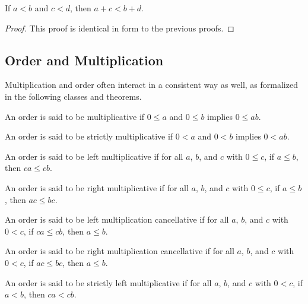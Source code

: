 \documentclass[../../math.tex]{subfiles}
\begin{document}
\begin{theorem} \label{lt_lrplus}
    If $a < b$ and $c < d$, then $a + c < b + d$.
\end{theorem}
\begin{proof}
    This proof is identical in form to the previous proofs.
\end{proof}

\subsection{Order and Multiplication}

Multiplication and order often interact in a consistent way as well, as
formalized in the following classes and theorems.

\begin{class}
    An order is said to be multiplicative if $0 \leq a$ and $0 \leq b$ implies
    $0 \leq ab$.
\end{class}

\begin{class}
    An order is said to be strictly multiplicative if $0 < a$ and $0 < b$
    implies $0 < ab$.
\end{class}

\begin{class}
    An order is said to be left multiplicative if for all $a$, $b$, and $c$ with
    $0 \leq c$, if $a \leq b$, then $ca \leq cb$.
\end{class}

\begin{class}
    An order is said to be right multiplicative if for all $a$, $b$, and $c$
    with $0 \leq c$, if $a \leq b$, then $ac \leq bc$.
\end{class}

\begin{class}
    An order is said to be left multiplication cancellative if for all $a$, $b$,
    and $c$ with $0 < c$, if $ca \leq cb$, then $a \leq b$.
\end{class}

\begin{class}
    An order is said to be right multiplication cancellative if for all $a$,
    $b$, and $c$ with $0 < c$, if $ac \leq bc$, then $a \leq b$.
\end{class}

\begin{class}
    An order is said to be strictly left multiplicative if for all $a$, $b$, and
    $c$ with $0 < c$, if $a < b$, then $ca < cb$.
\end{class}
\end{document}
